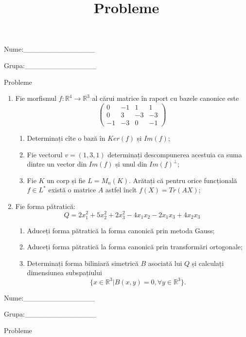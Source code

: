 \documentclass{article}
\title{Probleme}
\author{ }
\date{ }
\begin{document}
\begin{flushright}
Nume:\_\_\_\_\_\_\_\_\_\_\_\_\_\_
 
 
Grupa:\_\_\_\_\_\_\_\_\_\_\_\_\_\_
\end{flushright}
\begin{center}
\vspace{2cm}
{\Large Probleme}
\vspace{2cm}
\end{center}
\begin{enumerate}
 \item Fie morfismul $f:\mathbb{R}^4 \to \mathbb{R}^3$ al cărui matrice în raport cu bazele canonice este
$$\begin{pmatrix}
0&-1&1&1\\
0&3&-3&-3\\
-1&-3&0&-1
\end{pmatrix}$$

\begin{enumerate}
\item Determinați cîte o bază în $Ker(f)$ și $Im(f)$;
\item Fie vectorul $v=(1,3,1)$ determinați descompunerea acestuia ca suma dintre un vector din $Im(f)$ și unul din $Im(f)^\perp$;
\item Fie $K$ un corp și fie $L=M_n(K)$. Arătați că pentru orice funcțională $f \in L^*$ există o matrice $A$ astfel încît $f(X)=Tr(AX)$;
\end{enumerate}
\item Fie forma pătratică:
$$Q= 2x_1^2+5x_2^2+2x_3^2-4x_1x_2-2x_1x_3+4x_2x_3$$

\begin{enumerate}
\item Aduceți forma pătratică la forma canonică prin metoda Gauss;
\item Aduceți forma pătratică la forma canonică prin transformări ortogonale;
\item Determinați forma biliniară simetrică $B$ asociată lui $Q$ și calculați dimensiunea subspațiului
$$\{x \in \mathbb{R}^3 | B(x,y)=0,\forall y \in \mathbb{R}^3\}.$$

\end{enumerate}
\end{enumerate}
\newpage
\begin{flushright}
Nume:\_\_\_\_\_\_\_\_\_\_\_\_\_\_
 
 
Grupa:\_\_\_\_\_\_\_\_\_\_\_\_\_\_
\end{flushright}
\begin{center}
\vspace{2cm}
{\Large Probleme}
\vspace{2cm}
\end{center}
\end{document}
